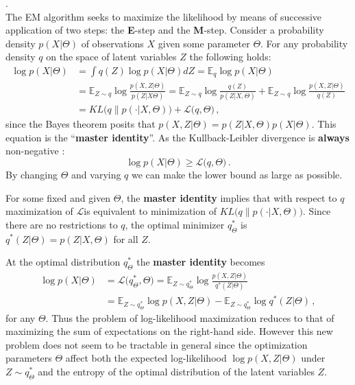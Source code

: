 \documentclass[a4paper]{article}
\begin{document}
 .\hfill\\
The EM algorithm seeks to maximize the likelihood by means of successive application
of two steps: the \textbf{E}-step and the \textbf{M}-step. Consider a probability
density $p(X|\Theta)$ of observations $X$ given some parameter $\Theta$. For any
probability density $q$ on the space of latent variables $Z$ the following holds:  
\begin{align*}
\log p(X|\Theta)
    &= \int q(Z) \log p(X|\Theta) dZ
     = \mathbb{E}_q \log p(X|\Theta) \\
    &= \mathbb{E}_{Z\sim q} \log \frac{p(X,Z|\Theta)}{p(Z|X\Theta)}
     = \mathbb{E}_{Z\sim q} \log \frac{q(Z)}{p(Z|X,\Theta)}
     + \mathbb{E}_{Z\sim q} \log \frac{p(X,Z|\Theta)}{q(Z)} \\ 
    &= KL\bigl(q\|p(\cdot|X,\Theta)\bigr) + \mathcal{L}\bigl(q, \Theta\bigr)\,,
\end{align*}
since the Bayes theorem posits that $p(X,Z|\Theta) = p(Z|X,\Theta) p(X|\Theta)$.
This equation is the ``\textbf{master identity}''. As the Kullback-Leibler divergence
is \textbf{always} non-negative :
\[ \log p(X|\Theta) \geq \mathcal{L}\bigl(q, \Theta\bigr) \,. \]
By changing $\Theta$ and varying $q$ we can make the lower bound as large as possible.

For some fixed and given $\Theta$, the \textbf{master identity} implies that with
respect to $q$ maximization of $\mathcal{L}$is equivalent to minimization of
$KL\bigl(q\|p(\cdot|X,\Theta)\bigr)$. Since there are no restrictions to $q$, the
optimal minimizer $q^*_\Theta$ is $q^*(Z|\Theta) = p(Z|X,\Theta)$ for all $Z$.

At the optimal distribution $q^*_\Theta$ the \textbf{master identity} becomes
\begin{align*}
\log p(X|\Theta)
&= \mathcal{L}\bigl(q^*_\Theta, \Theta\bigr)
= \mathbb{E}_{Z\sim q^*_\Theta} \log \frac{p(X,Z|\Theta)}{q^*(Z|\Theta)} \\
&= \mathbb{E}_{Z\sim q^*_\Theta} \log p(X,Z|\Theta) - \mathbb{E}_{Z\sim q^*_\Theta} \log q^*(Z|\Theta) \,,
\end{align*}
for any $\Theta$. Thus the problem of log-likelihood maximization reduces to that
of maximizing the sum of expectations on the right-hand side. However this new problem
does not seem to be tractable in general since the optimization parameters $\Theta$
affect both the expected log-likelihood $\log p(X,Z|\Theta)$ under $Z\sim q^*_\Theta$
and the entropy of the optimal distribution of the latent variables $Z$.
\end{document}

